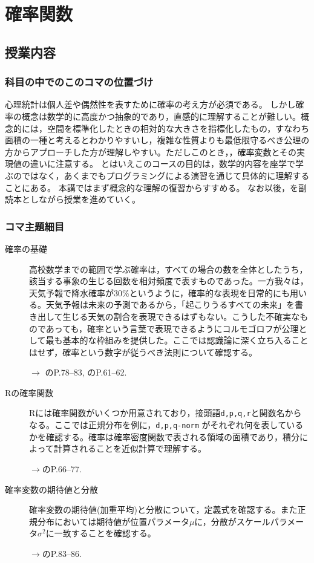 \section{確率関数}
\subsection{授業内容}
\subsubsection{科目の中でのこのコマの位置づけ}
心理統計は個人差や偶然性を表すために確率の考え方が必須である。
しかし確率の概念は数学的に高度かつ抽象的であり，直感的に理解することが難しい。概念的には，空間を標準化したときの相対的な大きさを指標化したもの，すなわち面積の一種と考えるとわかりやすいし，複雑な性質よりも最低限守るべき公理の方からアプローチした方が理解しやすい。ただしこのとき，，確率変数とその実現値の違いに注意する。
とはいえこのコースの目的は，数学的内容を座学で学ぶのではなく，あくまでもプログラミングによる演習を通じて具体的に理解することにある。
本講ではまず概念的な理解の復習からすすめる。
なお以後，\textcite{kosugi2023}を副読本としながら授業を進めていく。
\subsubsection{コマ主題細目}
\begin{description}
	\item[確率の基礎] 高校数学までの範囲で学ぶ確率は，すべての場合の数を全体としたうち，該当する事象の生じる回数を相対頻度で表すものであった。一方我々は，天気予報で降水確率が30\%というように，確率的な表現を日常的にも用いる。天気予報は未来の予測であるから，「起こりうるすべての未来」を書き出して生じる天気の割合を表現できるはずもない。こうした不確実なものであっても，確率という言葉で表現できるようにコルモゴロフが公理として最も基本的な枠組みを提供した。ここでは認識論に深く立ち入ることはせず，確率という数字が従うべき法則について確認する。
		\begin{flushright}
			$\to$ \textcite{Maeda2017}のP.78--83, \textcite{kosugi2023}のP.61--62.
		\end{flushright}
	\item[Rの確率関数] Rには確率関数がいくつか用意されており，接頭語\verb|d,p,q,r|と関数名からなる。ここでは正規分布を例に，\verb|d,p,q-norm| がそれぞれ何を表しているかを確認する。確率は確率密度関数で表される領域の面積であり，積分によって計算されることを近似計算で理解する。
		\begin{flushright}
			$\to$\textcite{kosugi2023}のP.66--77.
		\end{flushright}
	\item[確率変数の期待値と分散] 確率変数の期待値(加重平均)と分散について，定義式を確認する。また正規分布においては期待値が位置パラメータ$\mu$に，分散がスケールパラメータ$\sigma^2$に一致することを確認する。
		\begin{flushright}
			$\to$\textcite{kosugi2023}のP.83--86.
		\end{flushright}
\end{description}

